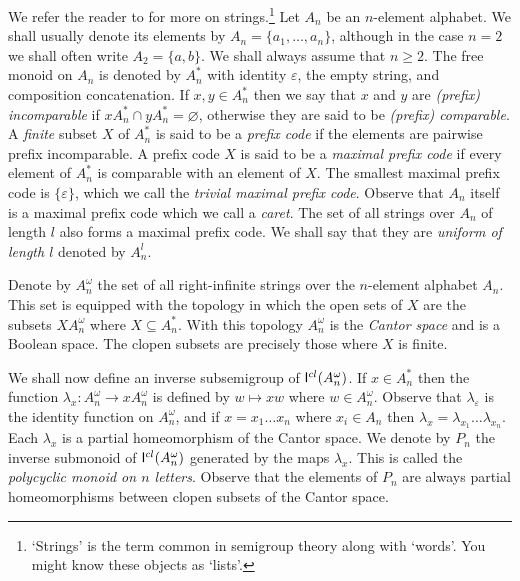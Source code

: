 \documentclass[a4paper]{amsart}
\begin{document}
We refer the reader to \cite{BP} for more on strings.\footnote{`Strings' is the term common in semigroup theory along with `words'. You might know these objects as `lists'.}
Let $A_{n}$ be an $n$-element alphabet.
We shall usually denote its elements by $A_{n} = \{a_{1}, \ldots, a_{n}\}$,
although in the case $n = 2$ we shall often write $A_{2} = \{a,b\}$.
We shall always assume that $n \geq 2$.
The free monoid on $A_{n}$ is denoted by $A_{n}^{\ast}$ with identity $\varepsilon$, the empty string,
and composition concatenation.
If $x,y \in A_{n}^{\ast}$ then we say that $x$ and $y$ are {\em (prefix) incomparable} if $xA_{n}^{\ast} \cap yA_{n}^{\ast} = \varnothing$,
otherwise they are said to be {\em (prefix) comparable}.
A {\em finite}  subset $X$ of $A_{n}^{\ast}$ is said to be a {\em prefix code}
if the elements are pairwise prefix incomparable.
A prefix code $X$ is said to be a {\em maximal prefix code} if every 
element of $A_{n}^{\ast}$ is comparable with an element of $X$.
The smallest maximal prefix code is $\{\varepsilon\}$, which we call the {\em trivial maximal prefix code}.
Observe that $A_{n}$ itself is a maximal prefix code
which we call  a {\em caret}.
The set of all strings over $A_{n}$ of length $l$
also forms a maximal prefix code.
We shall say that they are {\em uniform of length $l$} denoted by $A_{n}^{l}$.

Denote by $A_{n}^{\omega}$ the set of all right-infinite strings over the $n$-element alphabet $A_{n}$.
This set is equipped with the topology in which the open sets of $X$ are the subsets $XA_{n}^{\omega}$ where $X \subseteq A_{n}^{\ast}$.
With this topology $A_{n}^{\omega}$ is the {\em Cantor space} and is a Boolean space.
The clopen subsets are precisely those where $X$ is finite. 


We shall now define an inverse subsemigroup of $\mathsf{I}^{\tiny cl}(A_{n}^{\omega})$.
If $x \in A_{n}^{\ast}$ then the function $\lambda_{x} \colon A_{n}^{\omega} \rightarrow xA_{n}^{\omega}$ 
is defined by $w \mapsto xw$ where $w \in A_{n}^{\omega}$.
Observe that $\lambda_{\varepsilon}$ is the identity function on $A_{n}^{\omega}$,
and if $x = x_{1} \ldots x_{n}$ where $x_{i} \in A_{n}$ then
$\lambda_{x} = \lambda_{x_{1}} \ldots \lambda_{x_{n}}$.
Each $\lambda_{x}$ is a partial homeomorphism of the Cantor space.
We denote by $P_{n}$ the inverse submonoid of $\mathsf{I}^{\tiny cl}(A_{n}^{\omega})$
generated by the maps $\lambda_{x}$.
This is called the {\em polycyclic monoid on $n$ letters}.
Observe that the elements of $P_{n}$ are always partial homeomorphisms
between clopen subsets of the Cantor space.\\
\end{document}
